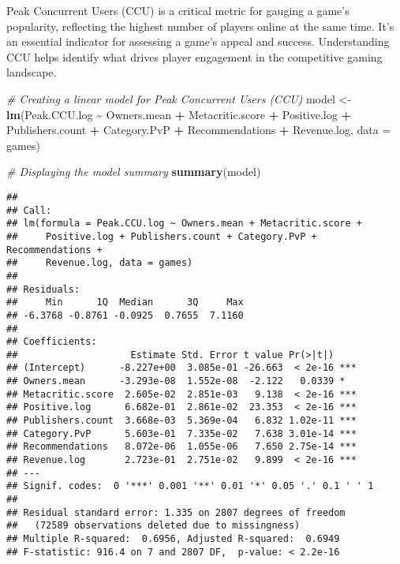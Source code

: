 \documentclass[
]{article}
\newenvironment{Shaded}{\begin{snugshade}}{\end{snugshade}}
\newcommand{\AttributeTok}[1]{\textcolor[rgb]{0.13,0.29,0.53}{#1}}
\newcommand{\CommentTok}[1]{\textcolor[rgb]{0.56,0.35,0.01}{\textit{#1}}}
\newcommand{\FunctionTok}[1]{\textcolor[rgb]{0.13,0.29,0.53}{\textbf{#1}}}
\newcommand{\NormalTok}[1]{#1}
\newcommand{\OtherTok}[1]{\textcolor[rgb]{0.56,0.35,0.01}{#1}}
\newcommand{\SpecialCharTok}[1]{\textcolor[rgb]{0.81,0.36,0.00}{\textbf{#1}}}
\begin{document}
Peak Concurrent Users (CCU) is a critical metric for gauging a game's
popularity, reflecting the highest number of players online at the same
time. It's an essential indicator for assessing a game's appeal and
success. Understanding CCU helps identify what drives player engagement
in the competitive gaming landscape.

\begin{Shaded}
\begin{Highlighting}[]
\CommentTok{\# Creating a linear model for Peak Concurrent Users (CCU)}
\NormalTok{model }\OtherTok{\textless{}{-}} \FunctionTok{lm}\NormalTok{(Peak.CCU.log }\SpecialCharTok{\textasciitilde{}}\NormalTok{ Owners.mean }\SpecialCharTok{+}\NormalTok{ Metacritic.score }\SpecialCharTok{+}\NormalTok{ Positive.log }\SpecialCharTok{+} 
\NormalTok{              Publishers.count }\SpecialCharTok{+}\NormalTok{ Category.PvP }\SpecialCharTok{+}\NormalTok{ Recommendations }\SpecialCharTok{+}
\NormalTok{              Revenue.log, }\AttributeTok{data =}\NormalTok{ games)}

\CommentTok{\# Displaying the model summary}
\FunctionTok{summary}\NormalTok{(model)}
\end{Highlighting}
\end{Shaded}

\begin{verbatim}
## 
## Call:
## lm(formula = Peak.CCU.log ~ Owners.mean + Metacritic.score + 
##     Positive.log + Publishers.count + Category.PvP + Recommendations + 
##     Revenue.log, data = games)
## 
## Residuals:
##     Min      1Q  Median      3Q     Max 
## -6.3768 -0.8761 -0.0925  0.7655  7.1160 
## 
## Coefficients:
##                    Estimate Std. Error t value Pr(>|t|)    
## (Intercept)      -8.227e+00  3.085e-01 -26.663  < 2e-16 ***
## Owners.mean      -3.293e-08  1.552e-08  -2.122   0.0339 *  
## Metacritic.score  2.605e-02  2.851e-03   9.138  < 2e-16 ***
## Positive.log      6.682e-01  2.861e-02  23.353  < 2e-16 ***
## Publishers.count  3.668e-03  5.369e-04   6.832 1.02e-11 ***
## Category.PvP      5.603e-01  7.335e-02   7.638 3.01e-14 ***
## Recommendations   8.072e-06  1.055e-06   7.650 2.75e-14 ***
## Revenue.log       2.723e-01  2.751e-02   9.899  < 2e-16 ***
## ---
## Signif. codes:  0 '***' 0.001 '**' 0.01 '*' 0.05 '.' 0.1 ' ' 1
## 
## Residual standard error: 1.335 on 2807 degrees of freedom
##   (72589 observations deleted due to missingness)
## Multiple R-squared:  0.6956, Adjusted R-squared:  0.6949 
## F-statistic: 916.4 on 7 and 2807 DF,  p-value: < 2.2e-16
\end{verbatim}
\end{document}
